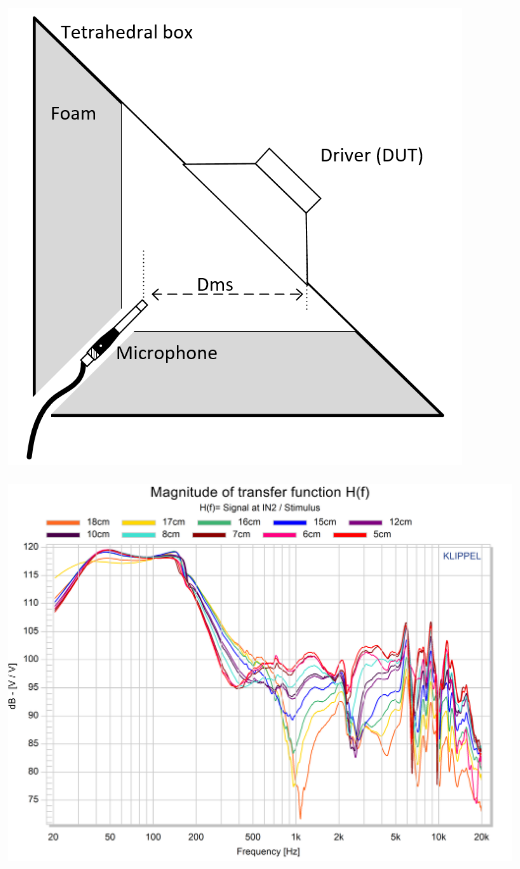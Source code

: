 \documentclass{report}
\begin{document}
\begin{minipage}{0.35\textwidth}
\begin{center}
	\includegraphics[width=0.9\textwidth]{RoomComp/Mic_Pos_Schm} 
    \captionsetup{hypcap=false} 
	\label{fig:micpos_schema}
\end{center}
\end{minipage}
\begin{minipage}{0.6\textwidth}
\begin{center}
	\includegraphics[width=1\textwidth]{RoomComp/MicPos_TRF} 
    \captionsetup{hypcap=false} 
	\label{fig:MicPosTRF}
\end{center}
\end{minipage}
\vspace{0.1cm}
\end{document}
